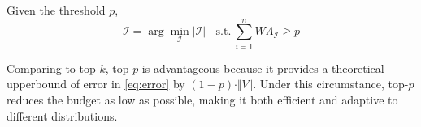 


\begin{definition} Given the threshold $p$,
\label{def:topp}
\begin{equation}
    \mathcal{I} = \arg\min_{\mathcal{I}} |\mathcal{I}|\ \ \ \ \text{s.t.} \ \sum_{i=1}^n W \Lambda_{\mathcal{I}} \ge p
\end{equation}
\end{definition}


Comparing to top-$k$, top-$p$ is advantageous because it provides a theoretical upperbound of error in \autoref{eq:error} by $(1-p) \cdot \Vert V \Vert$. Under this circumstance, top-$p$ reduces the budget as low as possible, making it both efficient and adaptive to different distributions.



